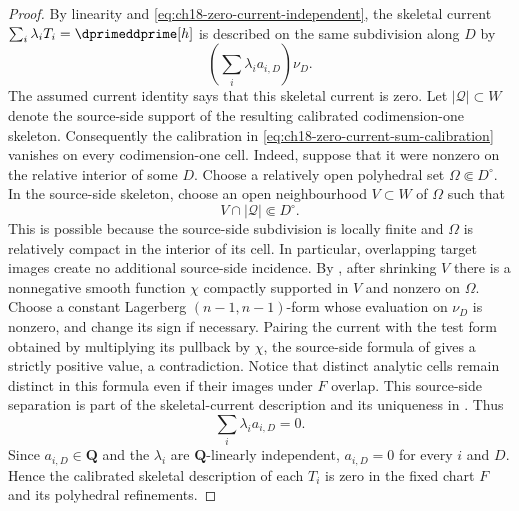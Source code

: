 \begin{proof}
By linearity and \eqref{eq:ch18-zero-current-independent}, the skeletal
current $\sum_i\lambda_iT_i=\dprimeddprime[h]$ is described on the same
subdivision along $D$ by
\begin{equation}
\label{eq:ch18-zero-current-sum-calibration}
                         \left(\sum_i\lambda_i a_{i,D}\right)\nu_D.
\end{equation}
The assumed current identity says that this skeletal current is zero.  Let
$|\mathscr Q|\subset W$ denote the source-side support of the resulting
calibrated codimension-one skeleton.  Consequently the calibration in
\eqref{eq:ch18-zero-current-sum-calibration} vanishes on every
codimension-one cell.  Indeed, suppose that it were nonzero on the relative
interior of some $D$.  Choose a relatively open polyhedral set
$\Omega\Subset D^\circ$.  In the source-side skeleton, choose an open
neighbourhood $V\subset W$ of $\Omega$ such that
\[
                         V\cap|\mathscr Q|\Subset D^\circ.
\]
This is possible because the source-side subdivision is locally finite and
$\Omega$ is relatively compact in the interior of its cell.  In particular,
overlapping target images create no additional source-side incidence.
By \cite[Corollary~6.2.4]{CLD25}, after shrinking $V$ there is a nonnegative
smooth function $\chi$ compactly supported in $V$ and nonzero on $\Omega$.
Choose a constant Lagerberg $(n-1,n-1)$-form whose evaluation on $\nu_D$ is
nonzero, and change its sign if necessary.  Pairing the current with the
test form obtained by multiplying its pullback by $\chi$, the source-side
formula of \cite[Definition~7.5.1]{CLD25} gives a strictly positive value, a
contradiction.  Notice that distinct analytic cells remain distinct in this
formula even if their images under $F$ overlap.  This source-side separation
is part of the skeletal-current description and its uniqueness in
\cite[Definition~7.5.1 and Propositions~7.5.7--7.5.8]{CLD25}.  Thus
\[
                         \sum_i\lambda_i a_{i,D}=0.
\]
Since $a_{i,D}\in\mathbf Q$ and the $\lambda_i$ are $\mathbf Q$-linearly
independent, $a_{i,D}=0$ for every $i$ and $D$.  Hence the calibrated
skeletal description of each $T_i$ is zero in the fixed chart $F$ and its
polyhedral refinements.


\end{proof}
